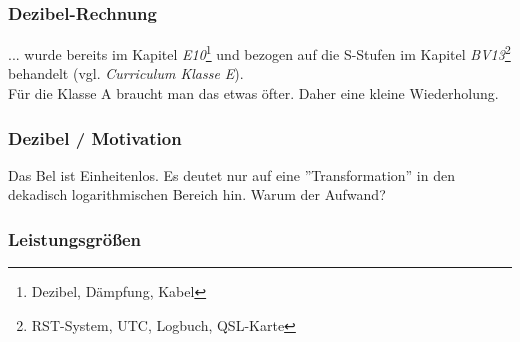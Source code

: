 \begin{frame}
    \frametitle{Dezibel-Rechnung}

    ... wurde bereits im Kapitel \emph{E10}\footnote{Dezibel, Dämpfung, Kabel} und
    bezogen auf die S-Stufen im Kapitel \emph{BV13}\footnote{RST-System, UTC, Logbuch, QSL-Karte}
    behandelt (vgl. \emph{Curriculum Klasse E}\hyperlink{refs}{\cite{curr}}). \\[2em]
    
    Für die Klasse A braucht man das etwas öfter. Daher eine kleine
    Wiederholung.

\end{frame}

\begin{frame}
    \frametitle{Dezibel / Motivation}

    Das Bel ist Einheitenlos. Es deutet nur auf eine ''Transformation'' in den
    dekadisch logarithmischen Bereich hin. Warum der Aufwand?


\end{frame}

\subsubsection{Leistungsgrößen}

